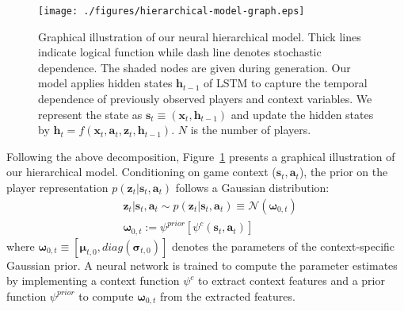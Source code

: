 \documentclass{article}
\newcommand{\context}{c}
\newcommand{\expect}{\mathbb{E}}
\newcommand{\latentvariables}{\mathbf{z}}
\newcommand{\hiddenstate}{\mathbf{h}}
\newcommand{\state}{\mathbf{s}}
\newcommand{\action}{\mathbf{a}}
\newcommand{\features}{\boldsymbol{x}}
\newcommand{\GaussianParameters}{\boldsymbol{\omega}}
\begin{document}
\begin{figure}[t]
    \centering
    \texttt{[image: ./figures/hierarchical-model-graph.eps]}
    \caption{Graphical illustration of our neural hierarchical model. Thick lines indicate logical function while dash line denotes stochastic dependence. The shaded nodes are given during generation. Our model applies hidden states $\hiddenstate_{t-1}$ of LSTM to capture the temporal dependence of  previously observed players and context variables. We represent the state as $\state_t \equiv (\features_{t},\hiddenstate_{t-1})$ and update the hidden states by $\hiddenstate_{t}=f(\features_{t},\action_{t},\latentvariables_{t},\hiddenstate_{t-1})$. $N$ is the number of players.
    } 
    \label{fig:hierarchical-model}
\end{figure} 
Following the above decomposition, Figure~\ref{fig:hierarchical-model} presents a graphical illustration of our hierarchical model.
Conditioning on game context ($\state_{t},\action_{t}$), the prior on the player representation $p(\latentvariables_{t}|\state_{t},\action_{t})$ follows a Gaussian distribution:
\vspace{-0.05in}
\begin{align}
    &\latentvariables_{t}|\state_{t},\action_{t}\sim p(\latentvariables_{t}|\state_{t},\action_{t}) \equiv \mathcal{N}(\boldsymbol{\GaussianParameters}_{0,t})\label{eqn:prior} \\
    &\boldsymbol{\GaussianParameters}_{0,t} :=\psi^{prior}[\psi^{\context}(\state_{t},\action_{t})]
\end{align}
\vspace{-0.01in}
\noindent where $\GaussianParameters_{0,t}\equiv[\boldsymbol{\mu}_{t,0},diag(\boldsymbol{\sigma}_{t,0})]$ denotes the parameters of the context-specific Gaussian prior. 
A neural network is trained to compute the parameter estimates by implementing 
a context function $\psi^{\context}$ to extract context features and a prior function $\psi^{prior}$ to compute $\boldsymbol{\GaussianParameters}_{0,t}$ from the extracted features. 
\end{document}
